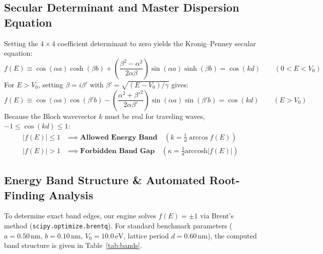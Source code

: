 \documentclass[10pt, a4paper]{article}
\begin{document}
\subsection{Secular Determinant and Master Dispersion Equation}
Setting the $4\times 4$ coefficient determinant to zero yields the Kronig--Penney secular equation:
\begin{equation}
\boxed{f(E) \equiv \cos(\alpha a)\cosh(\beta b) + \left(\frac{\beta^2 - \alpha^2}{2\alpha\beta}\right)\sin(\alpha a)\sinh(\beta b) = \cos(kd)} \qquad (0 < E < V_0)
\label{eq:kp_below}
\end{equation}
For $E > V_0$, setting $\beta = i\beta'$ with $\beta' = \sqrt{(E - V_0)/\gamma}$ gives:
\begin{equation}
f(E) \equiv \cos(\alpha a)\cos(\beta' b) - \left(\frac{\alpha^2 + \beta'^2}{2\alpha\beta'}\right)\sin(\alpha a)\sin(\beta' b) = \cos(kd) \qquad (E > V_0)
\label{eq:kp_above}
\end{equation}
Because the Bloch wavevector $k$ must be real for traveling waves, $-1 \le \cos(kd) \le 1$:
\begin{align}
|f(E)| \le 1 &\implies \textbf{Allowed Energy Band} \quad \left(k = \frac{1}{d}\arccos f(E)\right) \\
|f(E)| > 1 &\implies \textbf{Forbidden Band Gap} \quad \left(\kappa = \frac{1}{d}\text{arccosh}|f(E)|\right)
\end{align}

\subsection{Energy Band Structure \& Automated Root-Finding Analysis}
To determine exact band edges, our engine solves $f(E) = \pm 1$ via Brent's method (\texttt{scipy.optimize.brentq}). For standard benchmark parameters ($a = 0.50\,\text{nm}$, $b = 0.10\,\text{nm}$, $V_0 = 10.0\,\text{eV}$, lattice period $d = 0.60\,\text{nm}$), the computed band structure is given in Table~\ref{tab:bands}.
\end{document}
